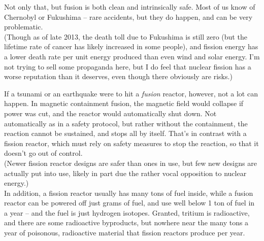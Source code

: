 Not only that, but fusion is both clean and intrinsically safe. Most of us know of Chernobyl or Fukushima -- rare accidents, but they do happen, and can be very problematic.\\
(Though as of late 2013, the death toll due to Fukushima is still zero (but the lifetime rate of cancer has likely increased in some people), and fission energy has a lower death rate per unit energy produced than even wind and solar energy. I'm not trying to sell some propaganda here, but I do feel that nuclear fission has a worse reputation than it deserves, even though there obviously are risks.)

If a tsunami or an earthquake were to hit a \emph{fusion} reactor, however, not a lot can happen. In magnetic containment fusion, the magnetic field would collapse if power was cut, and the reactor would automatically shut down. Not automatically as in a safety protocol, but rather without the containment, the reaction cannot be sustained, and stops all by itself. That's in contrast with a fission reactor, which must rely on safety measures to stop the reaction, so that it doesn't go out of control.\\
(Newer fission reactor designs are safer than ones in use, but few new designs are actually put into use, likely in part due the rather vocal opposition to nuclear energy.)\\
In addition, a fission reactor usually has many tons of fuel inside, while a fusion reactor can be powered off just grams of fuel, and use well below 1 ton of fuel in a year -- and the fuel is just hydrogen isotopes. Granted, tritium is radioactive, and there are some radioactive byproducts, but nowhere near the many tons a year of poisonous, radioactive material that fission reactors produce per year.
